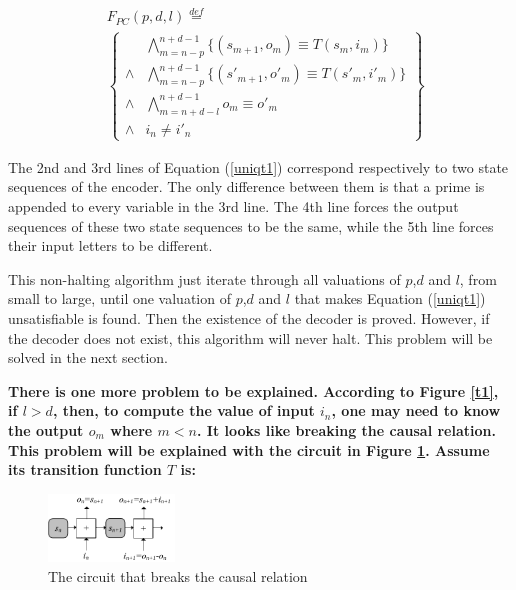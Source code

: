 \documentclass[journal]{IEEEtran}
\begin{document}
\begin{equation}\label{uniqt1}
\begin{split}
&F_{PC}(p,d,l)\overset{def}{=}\\
&\left\{
\begin{array}{cc}
&\bigwedge_{m=n-p}^{n+d-1}
\{
(s_{m+1},o_m)\equiv T(s_m,i_m)
\}
\\
\wedge&\bigwedge_{m=n-p}^{n+d-1}
\{
(s'_{m+1},o'_m)\equiv T(s'_m,i'_m)
\}
\\
\wedge&\bigwedge_{m=n+d-l}^{n+d-1}o_m\equiv o'_m \\
\wedge&i_n\ne i'_n
\end{array}
\right\}
\end{split}
\end{equation}


The 2nd and 3rd lines of Equation (\ref{uniqt1}) correspond respectively to two state sequences of the encoder.
The only difference between them is that a prime is appended to every variable in the 3rd line.
The 4th line forces the output sequences of these two state sequences to be the same,
while the 5th line forces their input letters to be different.

This non-halting algorithm\cite{ShengYuShen:iccad09} just iterate through all valuations of $p$,$d$ and $l$,
from small to large,
until one valuation of $p$,$d$ and $l$ that makes Equation (\ref{uniqt1}) unsatisfiable is found.
Then the existence of the decoder is proved.
However,
if the decoder does not exist,
this algorithm will never halt.
This problem will be solved in the next section.

\textbf{There is one more problem to be explained.
According to Figure \ref{t1},
if  $l > d$, then,
to compute the value of  input $i_n$,
one may need to know the output $o_m$ where $m < n$.
It looks like breaking the causal relation.
This problem will be explained with the circuit in Figure \ref{mealy_add}.
Assume its transition function $T$ is:}

\begin{figure}[t]
\begin{center}
\includegraphics[width=0.3\textwidth]{mealy_add}
\end{center}
\caption{The circuit that breaks the causal relation}
  \label{mealy_add}
\end{figure}
\end{document}

